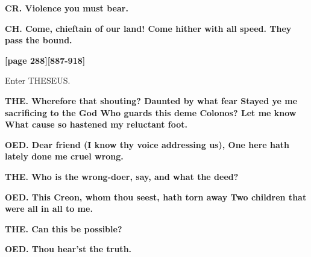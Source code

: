 \documentclass[11pt,letter]{book}
\begin{document}
\par \textbf{CR. Violence you must bear.}
\par 

\par \textbf{CH. Come, chieftain of our land! Come hither with all speed. They pass the bound.}
\par 

\par \textbf{[page 288][887-918]}
\par 

\par  Enter THESEUS.

\par \textbf{THE. Wherefore that shouting? Daunted by what fear Stayed ye me sacrificing to the God Who guards this deme Colonos? Let me know What cause so hastened my reluctant foot.}
\par 

\par \textbf{OED. Dear friend (I know thy voice addressing us), One here hath lately done me cruel wrong.}
\par 

\par \textbf{THE. Who is the wrong-doer, say, and what the deed?}
\par 

\par \textbf{OED. This Creon, whom thou seest, hath torn away Two children that were all in all to me.}
\par 

\par \textbf{THE. Can this be possible?}
\par 

\par \textbf{OED. Thou hear’st the truth.}
\par 
\end{document}
